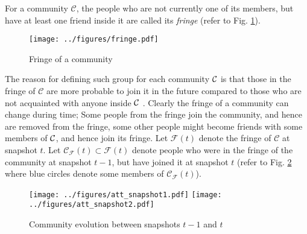 For a community $\mathcal{C}$, the people who are not currently one of its members, but have at least one friend inside it are called its \emph{fringe}  \cite{group_formation} (refer to Fig. \ref{fig: fringe}).  
\begin{figure}
\begin{center}
\texttt{[image: ../figures/fringe.pdf]}\caption{Fringe of a community}\label{fig: fringe}
\end{center}
\end{figure}
The reason for defining such group for each community  $\mathcal{C}$ is that those in the fringe of $\mathcal{C}$ are more probable to join it in the future compared to those who are not acquainted with anyone inside $\mathcal{C}$ \cite{group_formation}. Clearly the fringe of a community can change during time; Some people from the fringe join the community, and hence are removed from the fringe, some other people might become friends with some members of $\mathcal{C}$, and hence join its fringe.   Let $\mathcal{F}(t)$ denote the fringe of $\mathcal{C}$ at snapshot $t$.
Let $\mathcal{C}_{\mathcal{F}}(t)  \subset \mathcal{F}(t)$ denote people who 
were in the fringe of the community at snapshot $t-1$, but have joined it at snapshot  $t$ (refer to Fig. \ref{fig: evolution} where blue circles denote some members of $\mathcal{C}_{\mathcal{F}}(t)$).
\begin{figure}
\begin{center}
\texttt{[image: ../figures/att\_snapshot1.pdf]}
\texttt{[image: ../figures/att\_snapshot2.pdf]}\caption{Community evolution between snapshots $t-1$ and $t$}\label{fig: evolution}
\end{center}
\end{figure}


